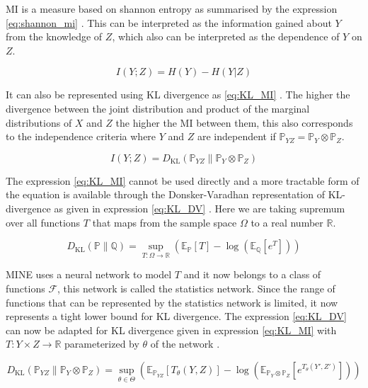 \documentclass[12pt,DIV14,BCOR12mm,a4paper,footinclude=false,headinclude,parskip=half-,twoside,openright,cleardoublepage=empty,toc=index,bibliography=totoc,listof=totoc]{scrreprt}
\numberwithin{equation}{chapter}
\begin{document}
MI is a measure based on shannon entropy as summarised by the expression \ref{eq:shannon_mi} \cite{DBLP:journals/corr/abs-1801-04062}. This can be interpreted as the information gained about $Y$ from the knowledge of $Z$, which also can be interpreted as the dependence of $Y$ on $Z$. 

\begin{equation}\label{eq:shannon_mi}
    I(Y;Z) = H(Y) - H(Y|Z)
\end{equation}

It can also be represented using KL divergence as \ref{eq:KL_MI} \cite{DBLP:journals/corr/abs-1801-04062}. The higher the divergence between the joint distribution and product of the marginal distributions of $X$ and $Z$ the higher the MI between them, this also corresponds to the independence criteria where $Y$ and $Z$ are independent if $\mathbb{P}_{YZ} = \mathbb{P}_Y \otimes \mathbb{P}_Z$.

\begin{equation}\label{eq:KL_MI}
    I(Y;Z) = D_{\text{KL}}(\mathbb{P}_{YZ} \| \mathbb{P}_Y \otimes
 \mathbb{P}_Z)
\end{equation}

The expression \ref{eq:KL_MI} cannot be used directly and a more tractable form of the equation is available through the Donsker-Varadhan representation of KL-divergence as given in expression \ref{eq:KL_DV} \cite{DBLP:journals/corr/abs-1801-04062}. Here we are taking supremum over all functions $T$ that maps from the sample space $\Omega$ to a real number $\mathbb{R}$.  

\begin{equation}\label{eq:KL_DV}
    D_{\text{KL}}(\mathbb{P}\|\mathbb{Q}) =  \sup_{T: \Omega \rightarrow \mathbb{R}} \left( \mathbb{E}_\mathbb{P}[T] - \log(\mathbb{E}_\mathbb{Q}[e^T]) \right)
\end{equation}

MINE uses a neural network to model $T$ and it now belongs to a class of functions $\mathcal{F}$, this network is called the statistics network. Since the range of functions that can be represented by the statistics network is limited, it now represents a tight lower bound for KL divergence. The expression \ref{eq:KL_DV} can now be adapted for KL divergence given in expression \ref{eq:KL_MI} with $T: Y \times Z \rightarrow \mathbb{R} $ parameterized by $\theta$ of the network \cite{DBLP:journals/corr/abs-1801-04062}.

\begin{equation}\label{eq:DV_MI}
    D_{\text{KL}}(\mathbb{P}_{YZ}\|\mathbb{P}_Y \otimes
 \mathbb{P}_Z) =  \sup_{\theta \in \Theta} \left( \mathbb{E}_{\mathbb{P}_{YZ}}[T_{\theta}(Y,Z)] - \log(\mathbb{E}_{\mathbb{P}_{Y} \otimes
 \mathbb{P}_Z}[e^{T_{\theta}(Y',Z')}]) \right)
\end{equation}
\end{document}
